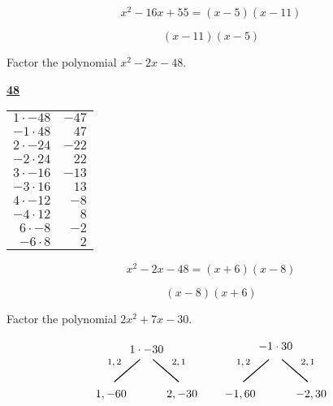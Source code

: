 \documentclass[12pt,letterpaper]{exam}
\begin{document}
\begin{questions}
	\[
	x^2 - 16x + 55= (x - 5)(x - 11)
	\] \pspace
	
	\[
	\boxed{(x - 11)(x - 5)}
	\]





\newpage
\question[5] Factor the polynomial $x^2 - 2x - 48$. \pspace

	\begin{table}[!ht]
	\centering
	\underline{\bfseries 48} \pvspace{0.2cm}
	\begin{tabular}{rr}
	$1 \cdot -48$ & $-47$ \\
	$-1 \cdot 48$ & $47$ \\
	$2 \cdot -24$ & $-22$ \\
	$-2 \cdot 24$ & $22$ \\
	$3 \cdot -16$ & $-13$ \\
	$-3 \cdot 16$ & $13$ \\
	$4 \cdot -12$ & $-8$ \\
	$-4 \cdot 12$ & $8$ \\ \hline
	\multicolumn{1}{|r}{$6 \cdot -8$} & \multicolumn{1}{r|}{$-2$} \\ \hline
	$-6 \cdot 8$ & $2$ \\
	\end{tabular}
	\end{table}

	\[
	x^2 - 2x - 48= (x + 6)(x - 8)
	\] \pspace
	
	\[
	\boxed{(x - 8)(x + 6)}
	\]





\newpage
\question[5] Factor the polynomial $2x^2 + 7x - 30$. \pspace

	\[
	\begin{tikzpicture}
	\node at (0,0) {$1 \cdot -30$};
	\node at (-1.0,-0.4) {\footnotesize$1, 2$};
	\draw[line width=0.03cm,label={1}] (-0.2,-0.3) -- (-1,-1);
	\node at (-1.1,-1.4) {$1, -60$};
	\node at (1.0,-0.4) {\footnotesize$2, 1$};
	\draw[line width=0.03cm] (0.2,-0.3) -- (1,-1);
	\node at (1.1,-1.4) {$2, -30$};	
	
	\tikzset{shift={(4,0)}}

	\node at (0,0.1) {$-1 \cdot 30$};
	\node at (-1.0,-0.4) {\footnotesize$1, 2$};
	\draw[line width=0.03cm,label={1}] (-0.2,-0.3) -- (-1,-1);
	\node at (-1.1,-1.4) {$-1, 60$};
	\node at (1.0,-0.4) {\footnotesize$2, 1$};
	\draw[line width=0.03cm] (0.2,-0.3) -- (1,-1);
	\node at (1.1,-1.4) {$-2, 30$};
	
	\tikzset{shift={(-4,-3)}}
	

\end{tikzpicture}\]
\end{questions}
\end{document}
